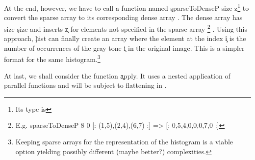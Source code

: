   At the end, however, we have to call a function
  named \c{sparseToDenseP size z}\footnote{Its type is  }
  to convert the sparse array  to its corresponding
  dense array \type{[:Int:]}. The dense array has size \c{size} and
  inserts \c{z} for elements not specified in the sparse array
  \footnote{E.g. \c{ sparseToDenseP 8 0 [: (1,5),(2,4),(6,7) :] => [: 0,5,4,0,0,0,7,0 :]}}
  .
  Using this approach, \c{hist} can finally create an array where
  the element at the index \c{i} is the number of occurrences
  of the gray tone \c{i} in the original image. This is
  a simpler format for the same histogram.\footnote{Keeping sparse arrays for the representation of the histogram is a viable option yielding possibly different (maybe better?) complexities.}
  
  At last, we shall consider the function \c{apply}. It uses a nested
  application of parallel functions and will be subject to flattening in \ndpv.
  
